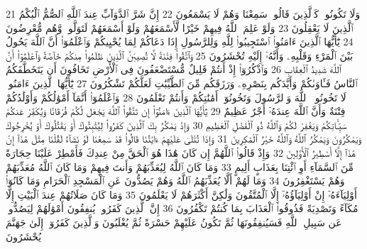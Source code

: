 {\tiny\colorbox{cl_aya}{21}} وَلَا تَكُونُوا۟ كَٱلَّذِينَ قَالُوا۟ سَمِعْنَا وَهُمْ لَا يَسْمَعُونَ
{\tiny\colorbox{cl_aya}{22}} إِنَّ شَرَّ ٱلدَّوَآبِّ عِندَ ٱللَّهِ ٱلصُّمُّ ٱلْبُكْمُ ٱلَّذِينَ لَا يَعْقِلُونَ
{\tiny\colorbox{cl_aya}{23}} وَلَوْ عَلِمَ ٱللَّهُ فِيهِمْ خَيْرًا لَّأَسْمَعَهُمْ وَلَوْ أَسْمَعَهُمْ لَتَوَلَّوا۟ وَّهُم مُّعْرِضُونَ
{\tiny\colorbox{cl_aya}{24}} يَٰٓأَيُّهَا ٱلَّذِينَ ءَامَنُوا۟ ٱسْتَجِيبُوا۟ لِلَّهِ وَلِلرَّسُولِ إِذَا دَعَاكُمْ لِمَا يُحْيِيكُمْ وَٱعْلَمُوٓا۟ أَنَّ ٱللَّهَ يَحُولُ بَيْنَ ٱلْمَرْءِ وَقَلْبِهِۦ وَأَنَّهُۥٓ إِلَيْهِ تُحْشَرُونَ
{\tiny\colorbox{cl_aya}{25}} وَٱتَّقُوا۟ فِتْنَةً لَّا تُصِيبَنَّ ٱلَّذِينَ ظَلَمُوا۟ مِنكُمْ خَآصَّةً وَٱعْلَمُوٓا۟ أَنَّ ٱللَّهَ شَدِيدُ ٱلْعِقَابِ
{\tiny\colorbox{cl_aya}{26}} وَٱذْكُرُوٓا۟ إِذْ أَنتُمْ قَلِيلٌ مُّسْتَضْعَفُونَ فِى ٱلْأَرْضِ تَخَافُونَ أَن يَتَخَطَّفَكُمُ ٱلنَّاسُ فَـَٔاوَىٰكُمْ وَأَيَّدَكُم بِنَصْرِهِۦ وَرَزَقَكُم مِّنَ ٱلطَّيِّبَٰتِ لَعَلَّكُمْ تَشْكُرُونَ
{\tiny\colorbox{cl_aya}{27}} يَٰٓأَيُّهَا ٱلَّذِينَ ءَامَنُوا۟ لَا تَخُونُوا۟ ٱللَّهَ وَٱلرَّسُولَ وَتَخُونُوٓا۟ أَمَٰنَٰتِكُمْ وَأَنتُمْ تَعْلَمُونَ
{\tiny\colorbox{cl_aya}{28}} وَٱعْلَمُوٓا۟ أَنَّمَآ أَمْوَٰلُكُمْ وَأَوْلَٰدُكُمْ فِتْنَةٌ وَأَنَّ ٱللَّهَ عِندَهُۥٓ أَجْرٌ عَظِيمٌ
{\tiny\colorbox{cl_aya}{29}} يَٰٓأَيُّهَا ٱلَّذِينَ ءَامَنُوٓا۟ إِن تَتَّقُوا۟ ٱللَّهَ يَجْعَل لَّكُمْ فُرْقَانًا وَيُكَفِّرْ عَنكُمْ سَيِّـَٔاتِكُمْ وَيَغْفِرْ لَكُمْ وَٱللَّهُ ذُو ٱلْفَضْلِ ٱلْعَظِيمِ
{\tiny\colorbox{cl_aya}{30}} وَإِذْ يَمْكُرُ بِكَ ٱلَّذِينَ كَفَرُوا۟ لِيُثْبِتُوكَ أَوْ يَقْتُلُوكَ أَوْ يُخْرِجُوكَ وَيَمْكُرُونَ وَيَمْكُرُ ٱللَّهُ وَٱللَّهُ خَيْرُ ٱلْمَٰكِرِينَ
{\tiny\colorbox{cl_aya}{31}} وَإِذَا تُتْلَىٰ عَلَيْهِمْ ءَايَٰتُنَا قَالُوا۟ قَدْ سَمِعْنَا لَوْ نَشَآءُ لَقُلْنَا مِثْلَ هَٰذَآ إِنْ هَٰذَآ إِلَّآ أَسَٰطِيرُ ٱلْأَوَّلِينَ
{\tiny\colorbox{cl_aya}{32}} وَإِذْ قَالُوا۟ ٱللَّهُمَّ إِن كَانَ هَٰذَا هُوَ ٱلْحَقَّ مِنْ عِندِكَ فَأَمْطِرْ عَلَيْنَا حِجَارَةً مِّنَ ٱلسَّمَآءِ أَوِ ٱئْتِنَا بِعَذَابٍ أَلِيمٍ
{\tiny\colorbox{cl_aya}{33}} وَمَا كَانَ ٱللَّهُ لِيُعَذِّبَهُمْ وَأَنتَ فِيهِمْ وَمَا كَانَ ٱللَّهُ مُعَذِّبَهُمْ وَهُمْ يَسْتَغْفِرُونَ
{\tiny\colorbox{cl_aya}{34}} وَمَا لَهُمْ أَلَّا يُعَذِّبَهُمُ ٱللَّهُ وَهُمْ يَصُدُّونَ عَنِ ٱلْمَسْجِدِ ٱلْحَرَامِ وَمَا كَانُوٓا۟ أَوْلِيَآءَهُۥٓ إِنْ أَوْلِيَآؤُهُۥٓ إِلَّا ٱلْمُتَّقُونَ وَلَٰكِنَّ أَكْثَرَهُمْ لَا يَعْلَمُونَ
{\tiny\colorbox{cl_aya}{35}} وَمَا كَانَ صَلَاتُهُمْ عِندَ ٱلْبَيْتِ إِلَّا مُكَآءً وَتَصْدِيَةً فَذُوقُوا۟ ٱلْعَذَابَ بِمَا كُنتُمْ تَكْفُرُونَ
{\tiny\colorbox{cl_aya}{36}} إِنَّ ٱلَّذِينَ كَفَرُوا۟ يُنفِقُونَ أَمْوَٰلَهُمْ لِيَصُدُّوا۟ عَن سَبِيلِ ٱللَّهِ فَسَيُنفِقُونَهَا ثُمَّ تَكُونُ عَلَيْهِمْ حَسْرَةً ثُمَّ يُغْلَبُونَ وَٱلَّذِينَ كَفَرُوٓا۟ إِلَىٰ جَهَنَّمَ يُحْشَرُونَ
